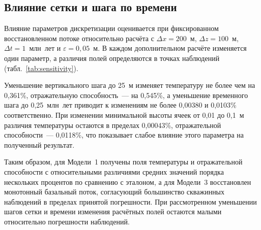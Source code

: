\subsection{Влияние сетки и шага по времени}

Влияние параметров дискретизации оценивается при фиксированном восстановленном потоке относительно расчёта с $\Delta x=200$~м, $\Delta z=100$~м, $\Delta t=1$~млн~лет и $\varepsilon=0{,}05$~м. В каждом дополнительном расчёте изменяется один параметр, а различия полей определяются в точках наблюдений (табл.~\ref{tab:sensitivity}).

Уменьшение вертикального шага до 25~м изменяет температуру не более чем на 0,361\%, отражательную способность~--- на 0,545\%, а уменьшение временного шага до 0,25~млн~лет приводит к изменениям не более 0,00380 и 0,0103\% соответственно. При изменении минимальной высоты ячеек от 0,01 до 0,1~м различия температуры остаются в пределах 0,00043\%, отражательной способности~--- 0,0118\%, что показывает слабое влияние этого параметра на полученный результат.



Таким образом, для Модели~1 получены поля температуры и отражательной способности с относительными различиями средних значений порядка нескольких процентов по сравнению с эталоном, а для Модели~3 восстановлен монотонный базальный поток, согласующий большинство скважинных наблюдений в пределах принятой погрешности. При рассмотренном уменьшении шагов сетки и времени изменения расчётных полей остаются малыми относительно погрешности наблюдений.
